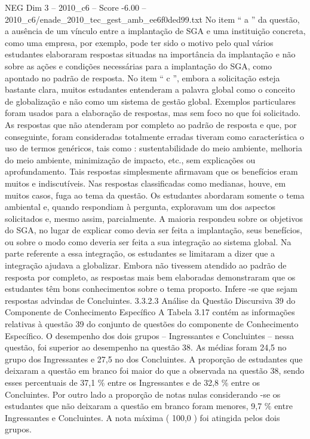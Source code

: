 \begin{textsample}{NEG Dim 3 – 2010\_c6 – Score -6.00 – 2010\_c6/enade\_2010\_tec\_gest\_amb\_ee6f0ded99.txt}
No item “ a ” da questão, a ausência de um vínculo entre a implantação de SGA e uma instituição concreta, como uma empresa, por exemplo, pode ter sido o motivo pelo qual vários estudantes elaboraram respostas situadas na importância da implantação e não sobre as ações e condições necessárias para a implantação do SGA, como apontado no padrão de resposta.
No item “ c ”, embora a solicitação esteja bastante clara, muitos estudantes entenderam a palavra global como o conceito de globalização e não como um sistema de gestão global.
Exemplos particulares foram usados para a elaboração de respostas, mas sem foco no que foi solicitado.
As respostas que não atenderam por completo ao padrão de resposta e que, por conseguinte, foram consideradas totalmente erradas tiveram como característica o uso de termos genéricos, tais como : sustentabilidade do meio ambiente, melhoria do meio ambiente, minimização de impacto, etc., sem explicações ou aprofundamento.
Tais respostas simplesmente afirmavam que os benefícios eram muitos e indiscutíveis.
Nas respostas classificadas como medianas, houve, em muitos casos, fuga ao tema da questão.
Os estudantes abordaram somente o tema ambiental e, quando respondiam à pergunta, exploravam um dos aspectos solicitados e, mesmo assim, parcialmente.
A maioria respondeu sobre os objetivos do SGA, no lugar de explicar como devia ser feita a implantação, seus benefícios, ou sobre o modo como deveria ser feita a sua integração ao sistema global.
Na parte referente a essa integração, os estudantes se limitaram a dizer que a integração ajudava a globalizar.
Embora não tivessem atendido ao padrão de resposta por completo, as respostas mais bem elaboradas demonstraram que os estudantes têm bons conhecimentos sobre o tema proposto.
Infere -se que sejam respostas advindas de Concluintes. 3.3.2.3 Análise da Questão Discursiva 39 do Componente de Conhecimento Específico A Tabela 3.17 contém as informações relativas à questão 39 do conjunto de questões do componente de Conhecimento Específico.
O desempenho dos dois grupos – Ingressantes e Concluintes – nessa questão, foi superior ao desempenho na questão 38.
As médias foram 24,5 no grupo dos Ingressantes e 27,5 no dos Concluintes.
A proporção de estudantes que deixaram a questão em branco foi maior do que a observada na questão 38, sendo esses percentuais de 37,1 \% entre os Ingressantes e de 32,8 \% entre os Concluintes.
Por outro lado a proporção de notas nulas considerando -se os estudantes que não deixaram a questão em branco foram menores, 9,7 \% entre Ingressantes e Concluintes.
A nota máxima ( 100,0 ) foi atingida pelos dois grupos.

\end{textsample}
